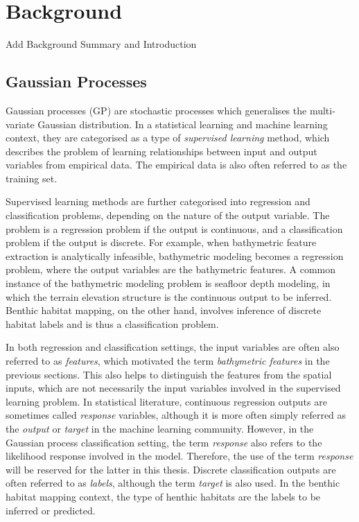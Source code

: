 \chapter{Background}
\label{Background}

	{\color{BurntOrange} Add Background Summary and Introduction}
		
	\newpage
	\section{Gaussian Processes}
	\label{Background:GaussianProcesses}
	
		Gaussian processes (GP) are stochastic processes which generalises the multi-variate Gaussian distribution. In a statistical learning and machine learning context, they are categorised as a type of \textit{supervised learning} method, which describes the problem of learning relationships between input and output variables from empirical data. The empirical data is also often referred to as the training set.
		
		Supervised learning methods are further categorised into regression and classification problems, depending on the nature of the output variable. The problem is a regression problem if the output is continuous, and a classification problem if the output is discrete. For example, when bathymetric feature extraction is analytically infeasible, bathymetric modeling becomes a regression problem, where the output variables are the bathymetric features. A common instance of the bathymetric modeling problem is seafloor depth modeling, in which the terrain elevation structure is the continuous output to be inferred. Benthic habitat mapping, on the other hand, involves inference of discrete habitat labels and is thus a classification problem.
		
		In both regression and classification settings, the input variables are often also referred to as \textit{features}, which motivated the term \textit{bathymetric features} in the previous sections. This also helps to distinguish the features from the spatial inputs, which are not necessarily the input variables involved in the supervised learning problem. In statistical literature, continuous regression outputs are sometimes called \textit{response} variables, although it is more often simply referred as the \textit{output} or \textit{target} in the machine learning community. However, in the Gaussian process classification setting, the term \textit{response} also refers to the likelihood response involved in the model. Therefore, the use of the term \textit{response} will be reserved for the latter in this thesis. Discrete classification outputs are often referred to as \textit{labels}, although the term \textit{target} is also used. In the benthic habitat mapping context, the type of henthic habitats are the labels to be inferred or predicted. 
		
